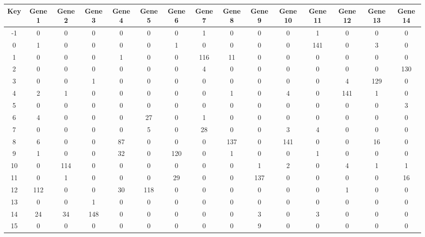 \begin{tabular}{|c|c|c|c|c|c|c|c|c|c|c|c|c|c|c|}
\hline
Key & Gene 1 & Gene 2 & Gene 3 & Gene 4 & Gene 5 & Gene 6 & Gene 7 & Gene 8 & Gene 9 & Gene 10 & Gene 11 & Gene 12 & Gene 13 & Gene 14 \\
\hline
-1 & 0 & 0 & 0 & 0 & 0 & 0 & 1 & 0 & 0 & 0 & 1 & 0 & 0 & 0 \\
0 & 1 & 0 & 0 & 0 & 0 & 1 & 0 & 0 & 0 & 0 & 141 & 0 & 3 & 0 \\
1 & 0 & 0 & 0 & 1 & 0 & 0 & 116 & 11 & 0 & 0 & 0 & 0 & 0 & 0 \\
2 & 0 & 0 & 0 & 0 & 0 & 0 & 4 & 0 & 0 & 0 & 0 & 0 & 0 & 130 \\
3 & 0 & 0 & 1 & 0 & 0 & 0 & 0 & 0 & 0 & 0 & 0 & 4 & 129 & 0 \\
4 & 2 & 1 & 0 & 0 & 0 & 0 & 0 & 1 & 0 & 4 & 0 & 141 & 1 & 0 \\
5 & 0 & 0 & 0 & 0 & 0 & 0 & 0 & 0 & 0 & 0 & 0 & 0 & 0 & 3 \\
6 & 4 & 0 & 0 & 0 & 27 & 0 & 1 & 0 & 0 & 0 & 0 & 0 & 0 & 0 \\
7 & 0 & 0 & 0 & 0 & 5 & 0 & 28 & 0 & 0 & 3 & 4 & 0 & 0 & 0 \\
8 & 6 & 0 & 0 & 87 & 0 & 0 & 0 & 137 & 0 & 141 & 0 & 0 & 16 & 0 \\
9 & 1 & 0 & 0 & 32 & 0 & 120 & 0 & 1 & 0 & 0 & 1 & 0 & 0 & 0 \\
10 & 0 & 114 & 0 & 0 & 0 & 0 & 0 & 0 & 1 & 2 & 0 & 4 & 1 & 1 \\
11 & 0 & 1 & 0 & 0 & 0 & 29 & 0 & 0 & 137 & 0 & 0 & 0 & 0 & 16 \\
12 & 112 & 0 & 0 & 30 & 118 & 0 & 0 & 0 & 0 & 0 & 0 & 1 & 0 & 0 \\
13 & 0 & 0 & 1 & 0 & 0 & 0 & 0 & 0 & 0 & 0 & 0 & 0 & 0 & 0 \\
14 & 24 & 34 & 148 & 0 & 0 & 0 & 0 & 0 & 3 & 0 & 3 & 0 & 0 & 0 \\
15 & 0 & 0 & 0 & 0 & 0 & 0 & 0 & 0 & 9 & 0 & 0 & 0 & 0 & 0 \\
\hline
\end{tabular}